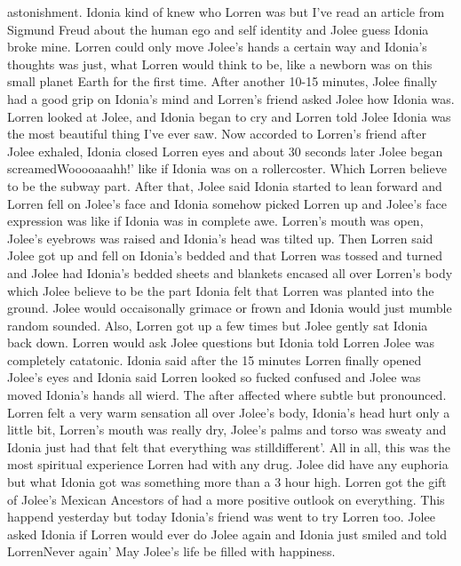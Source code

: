 \documentclass[12pt]{book}
\begin{document}
astonishment. Idonia kind of knew who Lorren was but I've read an article from Sigmund Freud about the human ego and self identity and Jolee guess Idonia broke mine. Lorren could only move Jolee's hands a certain way and Idonia's thoughts was just, what Lorren would think to be, like a newborn was on this small planet Earth for the first time. After another 10-15 minutes, Jolee finally had a good grip on Idonia's mind and Lorren's friend asked Jolee how Idonia was. Lorren looked at Jolee, and Idonia began to cry and Lorren told Jolee Idonia was the most beautiful thing I've ever saw. Now accorded to Lorren's friend after Jolee exhaled, Idonia closed Lorren eyes and about 30 seconds later Jolee began screamedWooooaaahh!' like if Idonia was on a rollercoster. Which Lorren believe to be the subway part. After that, Jolee said Idonia started to lean forward and Lorren fell on Jolee's face and Idonia somehow picked Lorren up and Jolee's face expression was like if Idonia was in complete awe. Lorren's mouth was open, Jolee's eyebrows was raised and Idonia's head was tilted up. Then Lorren said Jolee got up and fell on Idonia's bedded and that Lorren was tossed and turned and Jolee had Idonia's bedded sheets and blankets encased all over Lorren's body which Jolee believe to be the part Idonia felt that Lorren was planted into the ground. Jolee would occaisonally grimace or frown and Idonia would just mumble random sounded. Also, Lorren got up a few times but Jolee gently sat Idonia back down. Lorren would ask Jolee questions but Idonia told Lorren Jolee was completely catatonic. Idonia said after the 15 minutes Lorren finally opened Jolee's eyes and Idonia said Lorren looked so fucked confused and Jolee was moved Idonia's hands all wierd. The after affected where subtle but pronounced. Lorren felt a very warm sensation all over Jolee's body, Idonia's head hurt only a little bit, Lorren's mouth was really dry, Jolee's palms and torso was sweaty and Idonia just had that felt that everything was stilldifferent'. All in all, this was the most spiritual experience Lorren had with any drug. Jolee did have any euphoria but what Idonia got was something more than a 3 hour high. Lorren got the gift of Jolee's Mexican Ancestors of had a more positive outlook on everything. This happend yesterday but today Idonia's friend was went to try Lorren too. Jolee asked Idonia if Lorren would ever do Jolee again and Idonia just smiled and told LorrenNever again' May Jolee's life be filled with happiness.
\end{document}
